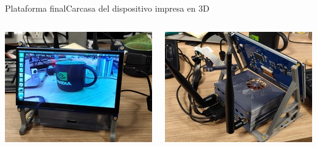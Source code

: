 \documentclass{beamer}
\begin{document}
    \begin{frame}{Plataforma final}{Carcasa del dispositivo impresa en 3D}
        \begin{columns}
            \includegraphics[width=\columnwidth,height=\columnwidth]{large_preview_front}
    
            \includegraphics[width=\columnwidth,height=\columnwidth]{large_preview_back}
        \end{columns}
    \end{frame}
\end{document}
